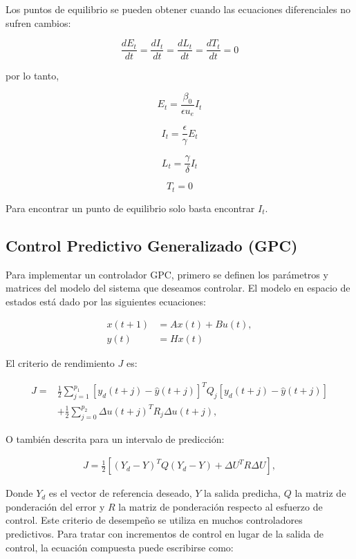 \documentclass[journal]{IEEEtran}
\begin{document}
Los puntos de equilibrio se pueden obtener cuando las ecuaciones diferenciales no sufren cambios:


$$\frac{dE_{t}}{dt} = \frac{dI_{t}}{dt} = \frac{dL_{t}}{dt} = \frac{dT_{t}}{dt} = 0$$

por lo tanto,

$$E_{t}=\frac{\beta_{0}}{\epsilon u_e}I_{t}$$

$$I_{t}=\frac{\epsilon}{\gamma}E_{t}$$

$$L_{t}=\frac{\gamma}{\delta}I_{t}$$

$$T_{t} = 0 $$

Para encontrar un punto de equilibrio solo basta encontrar $I_{t}$.


\subsection{Control Predictivo Generalizado (GPC)}
Para implementar un controlador GPC, primero se definen los parámetros y matrices del modelo del sistema que deseamos controlar. El modelo en espacio de estados está dado por las siguientes ecuaciones:

\begin{align}
x(t + 1) &= Ax(t) + Bu(t), \\
y(t) &= Hx(t) 
\end{align}

El criterio de rendimiento \( J \) es:


\begin{align*}
J = &\frac{1}{2} \sum_{j=1}^{p_1} [y_d(t + j) - \hat{y}(t + j)]^T Q_j [y_d(t + j) - \hat{y}(t + j)] \\
& + \frac{1}{2} \sum_{j=0}^{p_2} \Delta u(t + j)^T R_j \Delta u(t + j),
\end{align*}


O también descrita para un intervalo de predicción:

\begin{align}
J = \frac{1}{2} \left[ (Y_d - Y)^T Q (Y_d - Y) + \Delta U^T R \Delta U \right],
\end{align}

Donde \( Y_d \) es el vector de referencia deseado, \( Y \) la salida predicha,  \(Q\) la matriz de ponderación del error y \( R \) la matriz de ponderación respecto al esfuerzo de control. Este criterio de desempeño se utiliza en muchos controladores predictivos. Para tratar con incrementos de control en lugar de la salida de control, la ecuación compuesta puede escribirse como:
\end{document}
